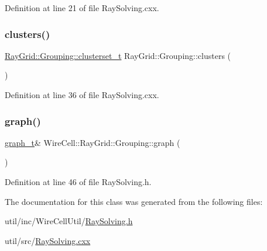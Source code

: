 Definition at line 21 of file Ray\+Solving.\+cxx.

\mbox{\label{class_wire_cell_1_1_ray_grid_1_1_grouping_a691790f384da883bcfcef022dd075504}} 
\subsubsection{\texorpdfstring{clusters()}{clusters()}}
{\footnotesize\ttfamily \hyperlink{class_wire_cell_1_1_ray_grid_1_1_grouping_a0a4ee47c906176803dd7b3e42803d0ed}{Ray\+Grid\+::\+Grouping\+::clusterset\+\_\+t} Ray\+Grid\+::\+Grouping\+::clusters (\begin{DoxyParamCaption}{ }\end{DoxyParamCaption})}



Definition at line 36 of file Ray\+Solving.\+cxx.

\mbox{\label{class_wire_cell_1_1_ray_grid_1_1_grouping_a7a0a10096795b1a1f6bc67122d0b34b5}} 
\subsubsection{\texorpdfstring{graph()}{graph()}}
{\footnotesize\ttfamily \hyperlink{class_wire_cell_1_1_ray_grid_1_1_grouping_a9db75b60d59cf5af39e5957af343b5d7}{graph\+\_\+t}\& Wire\+Cell\+::\+Ray\+Grid\+::\+Grouping\+::graph (\begin{DoxyParamCaption}{ }\end{DoxyParamCaption})\hspace{0.3cm}{\ttfamily [inline]}}



Definition at line 46 of file Ray\+Solving.\+h.



The documentation for this class was generated from the following files\+:\begin{DoxyCompactItemize}
\item 
util/inc/\+Wire\+Cell\+Util/\hyperlink{_ray_solving_8h}{Ray\+Solving.\+h}\item 
util/src/\hyperlink{_ray_solving_8cxx}{Ray\+Solving.\+cxx}\end{DoxyCompactItemize}
